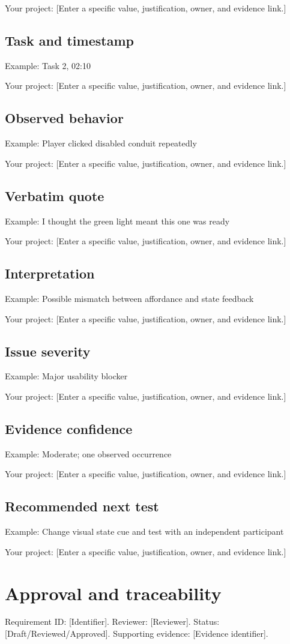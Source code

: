 \documentclass[11pt]{article}
\begin{document}
Your project: [Enter a specific value, justification, owner, and evidence link.]


\subsection{Task and timestamp}
Example: Task 2, 02:10

Your project: [Enter a specific value, justification, owner, and evidence link.]


\subsection{Observed behavior}
Example: Player clicked disabled conduit repeatedly

Your project: [Enter a specific value, justification, owner, and evidence link.]


\subsection{Verbatim quote}
Example: I thought the green light meant this one was ready

Your project: [Enter a specific value, justification, owner, and evidence link.]


\subsection{Interpretation}
Example: Possible mismatch between affordance and state feedback

Your project: [Enter a specific value, justification, owner, and evidence link.]


\subsection{Issue severity}
Example: Major usability blocker

Your project: [Enter a specific value, justification, owner, and evidence link.]


\subsection{Evidence confidence}
Example: Moderate; one observed occurrence

Your project: [Enter a specific value, justification, owner, and evidence link.]


\subsection{Recommended next test}
Example: Change visual state cue and test with an independent participant

Your project: [Enter a specific value, justification, owner, and evidence link.]


\section{Approval and traceability}
Requirement ID: [Identifier]. Reviewer: [Reviewer]. Status: [Draft/Reviewed/Approved]. Supporting evidence: [Evidence identifier].
\end{document}
